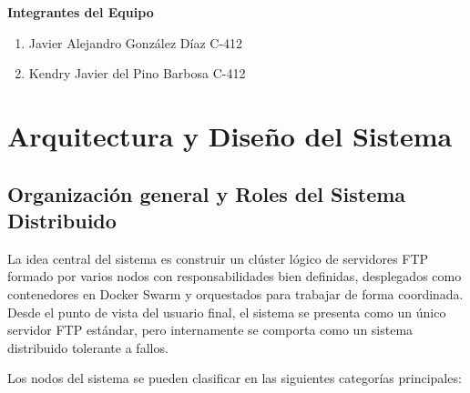 \documentclass{article}
\begin{document}
\vspace{5cm}

\vspace*{\fill}
\begin{center}
    \small \textbf{Integrantes del Equipo}
\end{center}
\begin{enumerate}
    \item Javier Alejandro González Díaz \hspace{3cm}C-412
    \item Kendry Javier del Pino Barbosa \hspace{3cm}C-412
\end{enumerate}

\thispagestyle{empty}

\newpage

\tableofcontents

\newpage

\section{Arquitectura y Diseño del Sistema}

\subsection{Organización general y Roles del Sistema Distribuido}

    La idea central del sistema es construir un clúster lógico de servidores FTP formado por varios nodos con responsabilidades bien definidas, desplegados como contenedores en Docker Swarm y 
orquestados para trabajar de forma coordinada. Desde el punto de vista del usuario final, el sistema se presenta como un único servidor FTP estándar, pero internamente se comporta como
un sistema distribuido tolerante a fallos. 

    Los nodos del sistema se pueden clasificar en las siguientes categorías principales:
\end{document}
